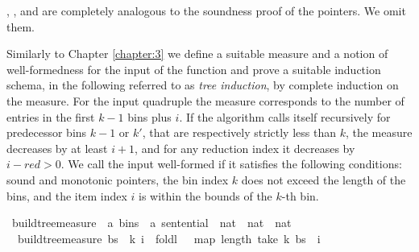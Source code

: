 \begin{isabellebody}
\begin{isamarkuptext}
, , and  are completely analogous to
the soundness proof of the pointers. We omit them.%
\end{isamarkuptext}\isamarkuptrue%
%
\begin{isamarkuptext}%
Similarly to Chapter \ref{chapter:3} we define a suitable measure and a notion of well-formedness
for the input of the function  and prove a suitable induction schema, in
the following referred to as \textit{tree induction}, by complete induction on the measure.
For the input quadruple  the measure corresponds to the number of entries
in the first $k-1$ bins plus $i$. If the algorithm calls itself recursively for predecessor bins
$k-1$ or $k'$, that are respectively strictly less than $k$, the measure decreases by at least $i+1$,
and for any reduction index  it decreases by $i - \mathit{red} > 0$. We call the input well-formed if it satisfies the following
conditions: sound and monotonic pointers, the bin index $k$ does not exceed the length of the bins, and the item
index $i$ is within the bounds of the $k$-th bin.%
\end{isamarkuptext}\isamarkuptrue%
\isamarkupfalse%
\ build{\isacharunderscore}{\kern0pt}tree{\isacharprime}{\kern0pt}{\isacharunderscore}{\kern0pt}measure\ {\isacharcolon}{\kern0pt}{\isacharcolon}{\kern0pt}\ {\isachardoublequoteopen}{\isacharparenleft}{\kern0pt}{\isacharprime}{\kern0pt}a\ bins\ {\isasymtimes}\ {\isacharprime}{\kern0pt}a\ sentential\ {\isasymtimes}\ nat\ {\isasymtimes}\ nat{\isacharparenright}{\kern0pt}\ {\isasymRightarrow}\ nat{\isachardoublequoteclose}\ \isanewline
\ \ {\isachardoublequoteopen}build{\isacharunderscore}{\kern0pt}tree{\isacharprime}{\kern0pt}{\isacharunderscore}{\kern0pt}measure\ {\isacharparenleft}{\kern0pt}bs{\isacharcomma}{\kern0pt}\ {\isasymomega}{\isacharcomma}{\kern0pt}\ k{\isacharcomma}{\kern0pt}\ i{\isacharparenright}{\kern0pt}\ {\isacharequal}{\kern0pt}\ foldl\ {\isacharparenleft}{\kern0pt}{\isacharplus}{\kern0pt}{\isacharparenright}{\kern0pt}\ {}\ {\isacharparenleft}{\kern0pt}map\ length\ {\isacharparenleft}{\kern0pt}take\ k\ bs{\isacharparenright}{\kern0pt}{\isacharparenright}{\kern0pt}\ {\isacharplus}{\kern0pt}\ i{\isachardoublequoteclose}\isanewline

\end{isabellebody}
